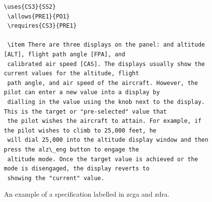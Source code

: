 \begin{figure}[H]
\begin{minipage}{0.45\textwidth}
\begin{tiny}
\begin{BVerbatim}[commandchars=+\[\]]
 \uses{CS3}{SS2}
 \allows{PRE1}{PO1}
 \requires{CS3}{PRE1}
 
 \item There are three displays on the panel: and altitude [ALT], flight path angle [FPA], and
 calibrated air speed [CAS]. The displays usually show the current values for the altitude, flight
 path angle, and air speed of the aircraft. However, the pilot can enter a new value into a display by
 dialling in the value using the knob next to the display. This is the target or "pre-selected" value that
 the pilot wishes the aircraft to attain. For example, if the pilot wishes to climb to 25,000 feet, he 
 will dial 25,000 into the altitude display window and then press the alz\_eng button to engage the 
 altitude mode. Once the target value is achieved or the mode is disengaged, the display reverts to 
 showing the "current" value.
 \end{BVerbatim}
 \end{tiny}
 \caption{An example of a specification labelled in \gls{zcga} and \gls{zdra}.\label{fig:zdrazcgaAno}}
 \end{minipage}\hfill
 \begin{minipage}{0.45\textwidth}
 \centering

\end{minipage}
\end{figure}
